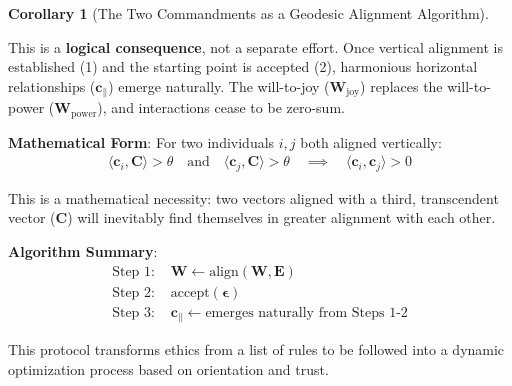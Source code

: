 \documentclass[11pt,a4paper]{article}
\theoremstyle{definition}
\newtheorem{corollary}{Corollary}[section]
\theoremstyle{remark}
\newcommand{\EE}{\mathbf{E}}
\newcommand{\WW}{\mathbf{W}}
\newcommand{\cc}{\mathbf{c}}
\begin{document}
\begin{corollary}[The Two Commandments as a Geodesic Alignment Algorithm]
\begin{enumerate}[label=\textbf{\arabic*.}, leftmargin=*]
    This is a \textbf{logical consequence}, not a separate effort. Once vertical alignment is established (1) and the starting point is accepted (2), harmonious horizontal relationships (\(\cc_{\parallel}\)) emerge naturally. The will-to-joy (\(\WW_{\text{joy}}\)) replaces the will-to-power (\(\WW_{\text{power}}\)), and interactions cease to be zero-sum. 
    
    \textbf{Mathematical Form}: For two individuals \(i, j\) both aligned vertically:
    \begin{align}
    \langle \cc_i, \mathbf{C} \rangle > \theta \quad \text{and} \quad \langle \cc_j, \mathbf{C} \rangle > \theta \quad \implies \quad \langle \cc_i, \cc_j \rangle > 0
    \end{align}
    
    This is a mathematical necessity: two vectors aligned with a third, transcendent vector (\(\mathbf{C}\)) will inevitably find themselves in greater alignment with each other.
\end{enumerate}

\textbf{Algorithm Summary}:
\begin{align}
\text{Step 1: } &\WW \gets \text{align}(\WW, \EE) \\
\text{Step 2: } &\text{accept}(\boldsymbol{\epsilon}) \\
\text{Step 3: } &\cc_{\parallel} \gets \text{emerges naturally from Steps 1-2}
\end{align}

This protocol transforms ethics from a list of rules to be followed into a dynamic optimization process based on orientation and trust.
\end{corollary}
\end{document}
